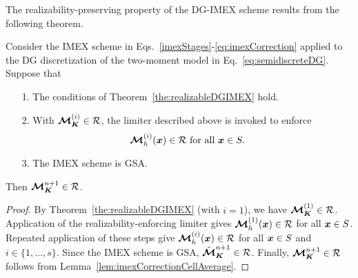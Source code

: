 The realizability-preserving property of the DG-IMEX scheme results from the following theorem.
\begin{theorem}
  Consider the IMEX scheme in Eqs.~\eqref{imexStages}-\eqref{eq:imexCorrection} applied to the DG discretization of the two-moment model in Eq.~\eqref{eq:semidiscreteDG}.  
  Suppose that
  \begin{itemize}
    \item[1.] The conditions of Theorem~\ref{the:realizableDGIMEX} hold.  
    \item[2.] With $\boldsymbol{\mathcal{M}}_{\boldsymbol{K}}^{(i)}\in\mathcal{R}$, the limiter described above is invoked to enforce 
    \begin{equation*}
      \boldsymbol{\mathcal{M}}_{h}^{(i)}(\boldsymbol{x})\in\mathcal{R} ~ \text{for all} ~ \boldsymbol{x} \in S.  
    \end{equation*}
    \item[3.] The IMEX scheme is GSA.  
  \end{itemize}
  Then $\boldsymbol{\boldsymbol{\mathcal{M}}}_{\boldsymbol{K}}^{n+1}\in\mathcal{R}$.  
  \label{the:realizableDGIMEX2}
\end{theorem}
\begin{proof}
  By Theorem~\ref{the:realizableDGIMEX} (with $i=1$), we have $\boldsymbol{\mathcal{M}}_{\boldsymbol{K}}^{(1)}\in\mathcal{R}$.  
  Application of the realizability-enforcing limiter gives $\boldsymbol{\mathcal{M}}_{h}^{(1)}(\boldsymbol{x})\in\mathcal{R}$ for all $\boldsymbol{x} \in S$.  
  Repeated application of these steps give $\boldsymbol{\mathcal{M}}_{h}^{(i)}(\boldsymbol{x})\in\mathcal{R}$ for all $\boldsymbol{x} \in S$ and $i\in\{1,\ldots,s\}$.  
  Since the IMEX scheme is GSA, $\tilde{\boldsymbol{\mathcal{M}}}_{\boldsymbol{K}}^{n+1}\in\mathcal{R}$.  
  Finally, $\boldsymbol{\boldsymbol{\mathcal{M}}}_{\boldsymbol{K}}^{n+1}\in\mathcal{R}$ follows from Lemma~\ref{lem:imexCorrectionCellAverage}.  
\end{proof}